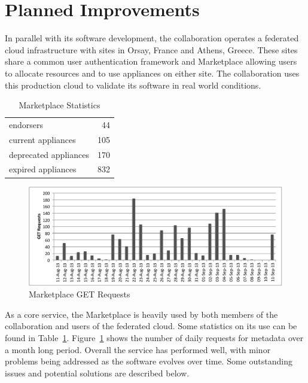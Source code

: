 \section{Planned Improvements}
\label{sec:production}

In parallel with its software development, the collaboration operates
a federated cloud infrastructure with sites in Orsay, France and
Athens, Greece\@.  These sites share a common user authentication
framework and Marketplace allowing users to allocate resources and to
use appliances on either site.  The collaboration uses this production
cloud to validate its software in real world conditions.

\begin{table}
\caption{Marketplace Statistics}
\label{table:statistics}
\begin{center}
\begin{tabular}{lr}
\hline
\hline
endorsers & 44 \\
current appliances & 105 \\
deprecated appliances & 170 \\
expired appliances & 832 \\
\hline
\hline
\end{tabular}
\end{center}
\end{table}

\begin{figure}
\begin{center}
\includegraphics[width=\columnwidth]{getrequests.pdf}
\end{center}
\caption{Marketplace GET Requests}
\label{fig:requests}
\end{figure}

As a core service, the Marketplace is heavily used by both members of
the collaboration and users of the federated cloud.  Some statistics
on its use can be found in Table~\ref{table:statistics}.  
Figure~\ref{fig:requests} shows the number of daily requests for 
metadata over a month long period. Overall the service has performed well, 
with minor problems being addressed as the software evolves over time.  
Some outstanding issues and potential solutions are described below.


